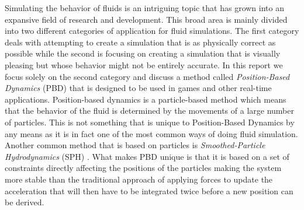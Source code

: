 Simulating the behavior of fluids is an intriguing topic that has grown into an
expansive field of research and development. This broad area is mainly divided
into two different categories of application for fluid simulations. The first
category deals with attempting to create a simulation that is as physically
correct as possible while the second is focusing on creating a simulation that
is visually pleasing but whose behavior might not be entirely accurate. In this
report we focus solely on the second category and discuss a method called
\textit{Position-Based Dynamics} (PBD) \cite{muller2007position} that is designed to be used in games and other real-time applications. Position-based dynamics is a
particle-based method which means that the behavior of the fluid is determined
by the movements of a large number of particles. This is not something that is
unique to Position-Based Dynamics by any means as it is in fact one of the most
common ways of doing fluid simulation. Another common method that is based on
particles is \textit{Smoothed-Particle Hydrodynamics} (SPH) \cite{monaghan1992smoothed}. What makes PBD unique is that it is based on a set of constraints directly affecting the positions of the particles making the system more stable than the traditional approach of applying forces to update the acceleration that will then have to be integrated twice before a new position can be derived.
